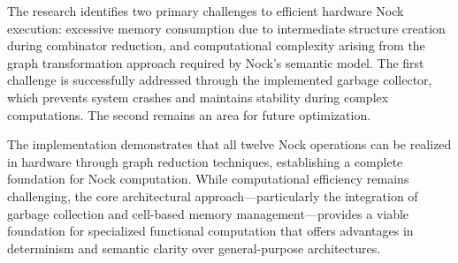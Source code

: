 \documentclass[twoside]{article}
\begin{document}
The research identifies two primary challenges to efficient hardware Nock execution: excessive memory consumption due to intermediate structure creation during combinator reduction, and computational complexity arising from the graph transformation approach required by Nock's semantic model. The first challenge is successfully addressed through the implemented garbage collector, which prevents system crashes and maintains stability during complex computations. The second remains an area for future optimization.

The implementation demonstrates that all twelve Nock operations can be realized in hardware through graph reduction techniques, establishing a complete foundation for Nock computation. While computational efficiency remains challenging, the core architectural approach—particularly the integration of garbage collection and cell-based memory management—provides a viable foundation for specialized functional computation that offers advantages in determinism and semantic clarity over general-purpose architectures.

\printbibliography
\end{document}
